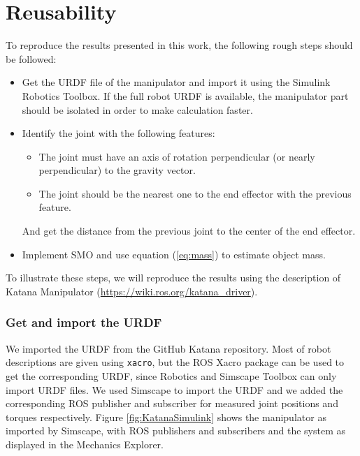 \documentclass[a4paper, 10pt]{article}
\begin{document}
\section{Reusability}
\label{sec:reusability}
To reproduce the results presented in this work, the following rough steps should be followed:
\begin{itemize}
\item Get the URDF file of the manipulator and import it using the Simulink Robotics Toolbox. If the full robot URDF is available, the manipulator part should be isolated in order to make calculation faster.
\item Identify the joint with the following features:
  \begin{itemize}
  \item The joint must have an axis of rotation perpendicular (or nearly perpendicular) to the gravity vector. 
  \item The joint should be the nearest one to the end effector with the previous feature. 
  \end{itemize}
  And get the distance from the previous joint to the center of the end effector.
\item Implement SMO and use equation (\ref{eq:mass}) to estimate object mass. 
\end{itemize}

To illustrate these steps, we will reproduce the results using the description of Katana Manipulator (\url{https://wiki.ros.org/katana_driver}).

\subsubsection*{Get and import the URDF}
We imported the URDF from the GitHub Katana repository. Most of robot descriptions are given using \texttt{xacro}, but the ROS Xacro package can be used to get the corresponding URDF, since Robotics and Simscape Toolbox can only import URDF files. We used Simscape to import the URDF and we added the corresponding ROS publisher and subscriber for measured joint positions and torques respectively. Figure \ref{fig:KatanaSimulink} shows the manipulator as imported by Simscape, with ROS publishers and subscribers and the system as displayed in the Mechanics Explorer. 
\end{document}
